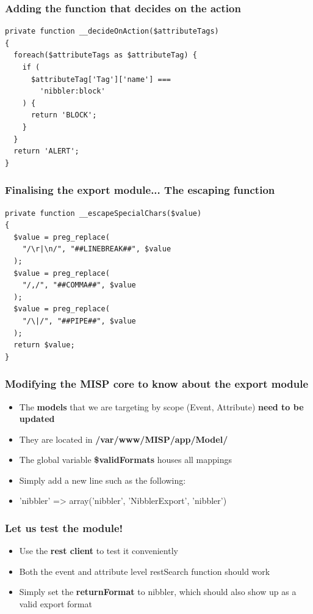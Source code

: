 \begin{frame}[fragile]
  \frametitle{Adding the function that decides on the action}
  \begin{lstlisting}
private function __decideOnAction($attributeTags)
{
  foreach($attributeTags as $attributeTag) {
    if (
      $attributeTag['Tag']['name'] ===
        'nibbler:block'
    ) {
      return 'BLOCK';
    }
  }
  return 'ALERT';
}
  \end{lstlisting}
\end{frame}

\begin{frame}[fragile]
  \frametitle{Finalising the export module... The escaping function}
  \begin{lstlisting}
private function __escapeSpecialChars($value)
{
  $value = preg_replace(
    "/\r|\n/", "##LINEBREAK##", $value
  );
  $value = preg_replace(
    "/,/", "##COMMA##", $value
  );
  $value = preg_replace(
    "/\|/", "##PIPE##", $value
  );
  return $value;
}
  \end{lstlisting}
\end{frame}

\begin{frame}[fragile]
  \frametitle{Modifying the MISP core to know about the export module}
  \begin{itemize}
    \item The {\bf models} that we are targeting by scope (Event, Attribute) {\bf need to be updated}
    \item They are located in {\bf /var/www/MISP/app/Model/}
    \item The global variable {\bf \$validFormats} houses all mappings
    \item Simply add a new line such as the following:
    \item 'nibbler' => array('nibbler', 'NibblerExport', 'nibbler')
  \end{itemize}
\end{frame}

\begin{frame}[fragile]
  \frametitle{Let us test the module!}
  \begin{itemize}
    \item Use the {\bf rest client} to test it conveniently
    \item Both the event and attribute level restSearch function should work
    \item Simply set the {\bf returnFormat} to nibbler, which should also show up as a valid export format
  \end{itemize}
\end{frame}

